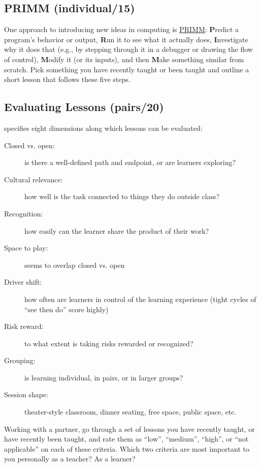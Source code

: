 \subsection*{PRIMM (individual/15)}

One approach to introducing new ideas in computing is \href{http://blogs.kcl.ac.uk/cser/2017/09/01/primm-a-structured-approach-to-teaching-programming/}{PRIMM}:
\textbf{P}redict a program's behavior or output, \textbf{R}un it to see what it
actually does, \textbf{I}nvestigate why it does that (e.g., by stepping
through it in a debugger or drawing the flow of control), \textbf{M}odify
it (or its inputs), and then \textbf{M}ake something similar from scratch.
Pick something you have recently taught or been taught and outline a
short lesson that follows these five steps.

\subsection*{Evaluating Lessons (pairs/20)}

\cite{Mart2017} specifies eight dimensions along which lessons can be
evaluated:

\begin{description}
\item[Closed vs. open:]
is there a well-defined path and endpoint, or are learners
exploring?
\item[Cultural relevance:]
how well is the task connected to things they do outside class?
\item[Recognition:]
how easily can the learner share the product of their work?
\item[Space to play:]
seems to overlap closed vs. open
\item[Driver shift:]
how often are learners in control of the learning experience (tight
cycles of ``see then do'' score highly)
\item[Risk reward:]
to what extent is taking risks rewarded or recognized?
\item[Grouping:]
is learning individual, in pairs, or in larger groups?
\item[Session shape:]
theater-style classroom, dinner seating, free space, public space,
etc.
\end{description}

Working with a partner, go through a set of lessons you have recently
taught, or have recently been taught, and rate them as ``low'', ``medium'',
``high'', or ``not applicable'' on each of these criteria. Which two
criteria are most important to you personally as a teacher? As a
learner?

